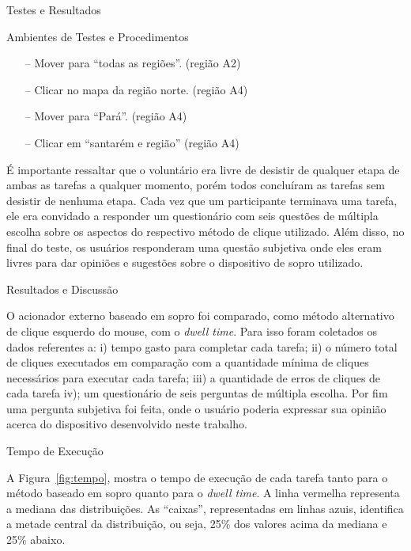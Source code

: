 \begin{chapter}{Testes e Resultados}
\begin{section}{Ambientes de Testes e Procedimentos}
\begin{itemize}
\begin{itemize}
\begin{itemize}
		\item[--] Mover para ``todas as regiões''.                       \hfill(região A2)
		\item[--] Clicar no mapa da região norte.                        \hfill(região A4)
		\item[--] Mover para ``Pará''.                                   \hfill(região A4)
		\item[--] Clicar em ``santarém e região''                        \hfill(região A4)
		\end{itemize}
	\end{itemize}
\end{itemize}

É importante ressaltar que o voluntário era livre de desistir de qualquer etapa
de ambas as tarefas a qualquer momento, porém todos concluíram as tarefas sem
desistir de nenhuma etapa. Cada vez que um participante terminava uma tarefa,
ele era convidado a responder um questionário com seis questões de múltipla
escolha sobre os aspectos do respectivo método de clique utilizado. Além disso,
no final do teste, os usuários responderam uma questão subjetiva onde eles eram
livres para dar opiniões e sugestões sobre o dispositivo de sopro utilizado.
\end{section}

\begin{section}{Resultados e Discussão}

O acionador externo baseado em sopro foi comparado, como
método alternativo de clique esquerdo do mouse, com o \textit{dwell time}. Para
isso foram coletados os dados referentes a: i) tempo gasto para completar cada
tarefa; ii) o número total de cliques executados em comparação com a quantidade
mínima de cliques necessários para executar cada tarefa; iii) a quantidade de
erros de cliques de cada tarefa iv); um questionário de seis perguntas de
múltipla escolha. Por fim uma pergunta subjetiva foi feita, onde o usuário
poderia expressar sua opinião acerca do dispositivo desenvolvido neste trabalho.

\begin{subsection}{Tempo de Execução}

A Figura~\ref{fig:tempo}, mostra o tempo de execução de cada tarefa tanto para o
método baseado em sopro quanto para o \textit{dwell time}. A linha vermelha
representa a mediana das distribuições. As ``caixas'', representadas em linhas
azuis, identifica a metade central da distribuição, ou seja, 25\% dos valores
acima da mediana e 25\% abaixo.


\end{subsection}
\end{section}
\end{chapter}
